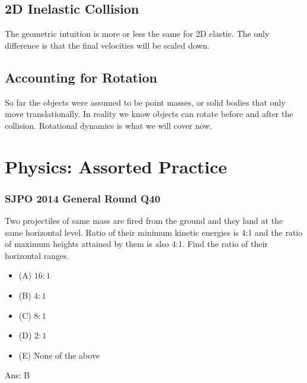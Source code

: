 \documentclass{article}
\begin{document}
\subsection{2D Inelastic Collision}
The geometric intuition is more or less the same for 2D elastic. The only difference is that the final velocities will be scaled down.

\subsection{Accounting for Rotation}
So far the objects were assumed to be point masses, or solid bodies that only move translationally. In reality we know objects can rotate before and after the collision. Rotational dynamics is what we will cover now.
\clearpage
\section{Physics: Assorted Practice}

\subsubsection{SJPO 2014 General Round Q40}
Two projectiles of same mass are fired from the ground and they land at the same horizontal level. Ratio of their minimum kinetic energies is 4:1 and the ratio of maximum heights attained by them is also 4:1. Find the ratio of their horizontal ranges.
\begin{itemize}
\item[](A) $16: 1$
\item[](B) $4: 1$
\item[](C) $8: 1$
\item[](D) $2: 1$
\item[](E) None of the above
\end{itemize}
Ans: \ifpaper B \fi
\end{document}
